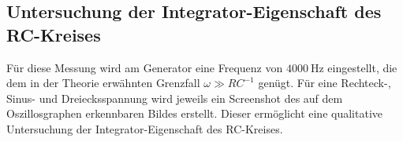 \subsection{Untersuchung der Integrator-Eigenschaft des RC-Kreises}
Für diese Messung wird am Generator eine Frequenz von $\SI{4000}{\hertz}$ eingestellt, die dem in der Theorie erwähnten Grenzfall $\omega \gg RC^{-1}$ genügt. %
Für eine Rechteck-, Sinus- und Dreiecksspannung wird
jeweils ein Screenshot des auf dem Oszillosgraphen erkennbaren Bildes erstellt. Dieser ermöglicht eine qualitative Untersuchung der %
Integrator-Eigenschaft des RC-Kreises. %
